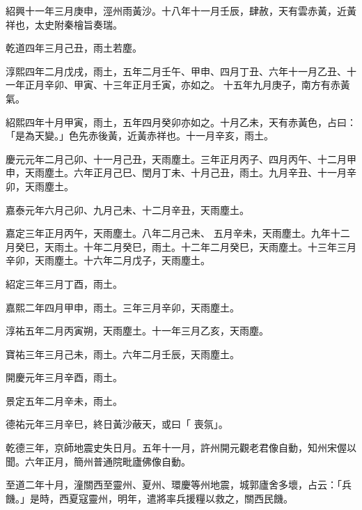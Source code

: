 \begin{pinyinscope}
 紹興十一年三月庚申，涇州雨黃沙。十八年十一月壬辰，肆赦，天有雲赤黃，近黃祥也，太史附秦檜旨奏瑞。



 乾道四年三月己丑，雨土若塵。



 淳熙四年二月戊戌，雨土，五年二月壬午、甲申、四月丁丑、六年十一月乙丑、十一年正月辛卯、甲寅、十三年正月壬寅，亦如之。
 十五年九月庚子，南方有赤黃氣。



 紹熙四年十月甲寅，雨土，五年四月癸卯亦如之。十月乙未，天有赤黃色，占曰：「是為天變。」色先赤後黃，近黃赤祥也。十一月辛亥，雨土。



 慶元元年二月己卯、十一月己丑，天雨塵土。三年正月丙子、四月丙午、十二月甲申，天雨塵土。六年正月己巳、閏月丁未、十月己丑，雨土。九月辛丑、十一月辛卯，天雨塵土。



 嘉泰元年六月己卯、九月己未、十二月辛丑，天雨塵土。



 嘉定三年正月丙午，天雨塵土。八年二月己未、
 五月辛未，天雨塵土。九年十二月癸巳，天雨土。十年二月癸巳，雨土。十二年二月癸巳，天雨塵土。十三年三月辛卯，天雨塵土。十六年二月戊子，天雨塵土。



 紹定三年三月丁酉，雨土。



 嘉熙二年四月甲申，雨土。三年三月辛卯，天雨塵土。



 淳祐五年二月丙寅朔，天雨塵土。十一年三月乙亥，天雨塵。



 寶祐三年三月己未，雨土。六年二月壬辰，天雨塵土。



 開慶元年三月辛酉，雨土。



 景定五年二月辛未，雨土。



 德祐元年三月辛巳，終日黃沙蔽天，或曰「
 喪氛」。



 乾德三年，京師地震史失日月。五年十一月，許州開元觀老君像自動，知州宋偓以聞。六年正月，簡州普通院毗廬佛像自動。



 至道二年十月，潼關西至靈州、夏州、環慶等州地震，城郭廬舍多壞，占云：「兵饑。」是時，西夏寇靈州，明年，遣將率兵援糧以救之，關西民饑。




\end{pinyinscope}
